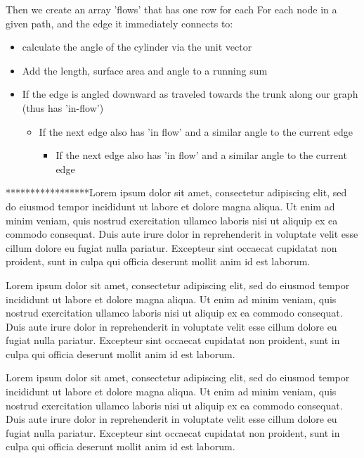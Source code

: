 \documentclass[jou,apacite]{apa6}
\begin{document}
Then we create an array 'flows' that has one row for each 
For each node in a given path, and the edge it immediately connects to:
\begin{itemize}
    \item calculate the angle of the cylinder via the unit vector
    \item Add the length, surface area and angle to a running sum
    \item If the edge is angled downward as traveled towards the trunk along our graph (thus has 'in-flow')
    \begin{itemize}
        \item If the next edge also has 'in flow' and a similar angle to the current edge
        \begin{itemize}
            \item If the next edge also has 'in flow' and a similar angle to the current edge
    
        \end{itemize}
    \end{itemize}
\end{itemize}
    

*****************Lorem ipsum dolor sit amet, consectetur adipiscing elit, sed do eiusmod tempor incididunt ut labore et dolore magna aliqua. Ut enim ad minim veniam, quis nostrud exercitation ullamco laboris nisi ut aliquip ex ea commodo consequat. Duis aute irure dolor in reprehenderit in voluptate velit esse cillum dolore eu fugiat nulla pariatur. Excepteur sint occaecat cupidatat non proident, sunt in culpa qui officia deserunt mollit anim id est laborum.

Lorem ipsum dolor sit amet, consectetur adipiscing elit, sed do eiusmod tempor incididunt ut labore et dolore magna aliqua. Ut enim ad minim veniam, quis nostrud exercitation ullamco laboris nisi ut aliquip ex ea commodo consequat. Duis aute irure dolor in reprehenderit in voluptate velit esse cillum dolore eu fugiat nulla pariatur. Excepteur sint occaecat cupidatat non proident, sunt in culpa qui officia deserunt mollit anim id est laborum.

Lorem ipsum dolor sit amet, consectetur adipiscing elit, sed do eiusmod tempor incididunt ut labore et dolore magna aliqua. Ut enim ad minim veniam, quis nostrud exercitation ullamco laboris nisi ut aliquip ex ea commodo consequat. Duis aute irure dolor in reprehenderit in voluptate velit esse cillum dolore eu fugiat nulla pariatur. Excepteur sint occaecat cupidatat non proident, sunt in culpa qui officia deserunt mollit anim id est laborum.
\end{document}
